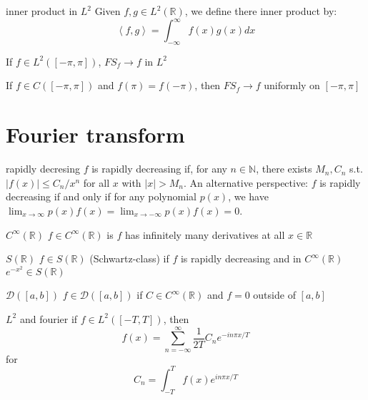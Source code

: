 \documentclass[a4paper]{article}
\newcommand{\R}{\mathbb{R}}
\newcommand{\N}{\mathbb{N}}
\begin{document}
\begin{Definition}{inner product in $L^2$}{}
	Given $f,g \in L^2(\R)$, we define there inner product by: \[
		\left< f,g \right> = \int_{-\infty}^{\infty} f(x)g(x)dx
	\] 
\end{Definition}

\begin{Theorem}{}{}
	If $f \in L^2\left( \left[ -\pi,\pi \right]  \right) $, $FS_f \to f$ in $L^2$
\end{Theorem}

\begin{Theorem}{}{}
	If $f \in C\left( \left[ -\pi,\pi \right]  \right) $ and $f(\pi) = f(-\pi)$, then $FS_f \to f$ uniformly on $\left[ -\pi,\pi \right] $
\end{Theorem}

\section{Fourier transform}

\begin{Definition}{rapidly decresing}{}
	$f$ is rapidly decreasing if, for any  $n \in \N$, there exists $M_n, C_n$ s.t. $|f(x)| \leq C_{n} / x^{n}$ for all $x$ with $|x|>M_{n}$. An alternative perspective: $f$ is rapidly decreasing if and only if for any polynomial $p(x)$, we have $\lim _{x \rightarrow \infty} p(x) f(x)=\lim _{x \rightarrow-\infty} p(x) f(x)=0$.
\end{Definition}

\begin{Definition}{$C^\infty(\R)$}{}
	$f \in C^\infty(\R)$ is $f$ has infinitely many derivatives at all  $x \in \R$
\end{Definition}

\begin{Definition}{$S(\R)$}{}
	$f \in S(\R)$ (Schwartz-class) if $f$ is rapidly decreasing and in  $C^\infty(\R)$
\tcblower
$e^{-x^2} \in S(\R)$
\end{Definition}

\begin{Definition}{$\mathcal{D}([a, b])$}{}
	$f \in \mathcal{D}([a, b])$ if $C \in C^\infty(\R)$ and $f = 0$ outside of  $\left[ a,b \right] $
\end{Definition}

\begin{Theorem}{$L^2$ and fourier}{}
	if $f \in L^2 ([-T,T])$, then \[
	f(x)=\sum_{n=-\infty}^{\infty} \frac{1}{2 T} C_{n} e^{-i n \pi x / T}
	\] for \[
	C_{n}=\int_{-T}^{T} f(x) e^{i n \pi x / T}
	\] 
\end{Theorem}
\end{document}
